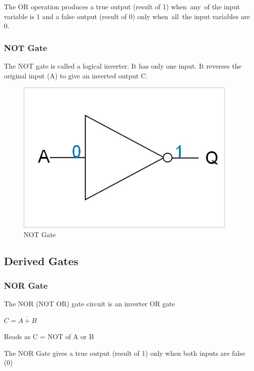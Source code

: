 \documentclass{article}
\begin{document}
					The OR operation produces a true output (result of 1) when any of the input variable is 1 and a false output (result of 0) only when all the input variables are 0.
				\newpage	
				\subsubsection{NOT Gate}
					The NOT gate is called a logical inverter.
					It has only one input. It reverses the original input (A) to give an inverted output C.
					\begin{figure}[h!]
						\begin{center}
							\caption{NOT Gate}
							\label{fig 3: NOT Gate}
							\includegraphics[width=0.5\linewidth]{pictures/NOT gate.jpg}
						\end{center}
					\end{figure}
				
			\subsection{Derived Gates}
				\subsubsection{NOR Gate}
					The NOR (NOT OR) gate circuit is an inverter OR gate
					\begin{center}
						\begin{math}
							C = \overline{A+B}
						\end{math}
					\end{center}
				
					Reads as C = NOT of A or B
					
					The NOR Gate gives a true output (result of 1) only when both inputs are false (0)
					
\end{document}
